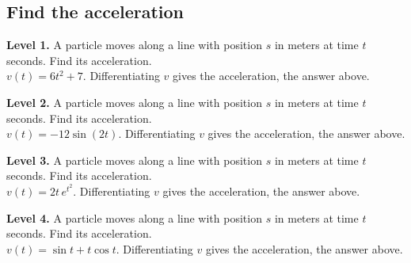 \documentclass[11pt]{article}
\begin{document}
\subsection*{Find the acceleration}
\noindent\textbf{Level 1.} A particle moves along a line with position $s$ in meters at time $t$ seconds. Find its acceleration.\\  \quad $v(t)=6t^{2}+7$. Differentiating $v$ gives the acceleration, the answer above.\par\medskip
\noindent\textbf{Level 2.} A particle moves along a line with position $s$ in meters at time $t$ seconds. Find its acceleration.\\  \quad $v(t)=-12\sin(2t)$. Differentiating $v$ gives the acceleration, the answer above.\par\medskip
\noindent\textbf{Level 3.} A particle moves along a line with position $s$ in meters at time $t$ seconds. Find its acceleration.\\  \quad $v(t)=2t\,e^{t^{2}}$. Differentiating $v$ gives the acceleration, the answer above.\par\medskip
\noindent\textbf{Level 4.} A particle moves along a line with position $s$ in meters at time $t$ seconds. Find its acceleration.\\  \quad $v(t)=\sin t+t\cos t$. Differentiating $v$ gives the acceleration, the answer above.\par\medskip
\end{document}
